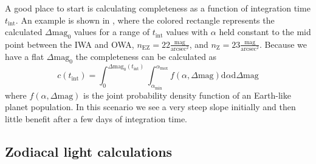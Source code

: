 A good place to start is calculating completeness
as a function of integration time $t_\textrm{int}$. An example
is shown in , where the colored rectangle
represents the calculated $\Delta\textrm{mag}_0$ values for a range of
$t_\textrm{int}$ values with $\alpha$ held constant to the mid point between
the IWA and OWA, $n_\textrm{EZ}=22 \frac{\textrm{mag}}{\textrm{arcsec}^2}$, and
$n_\textrm{Z}=23 \frac{\textrm{mag}}{\textrm{arcsec}^2}$. Because we have a
flat $\Delta\textrm{mag}_0$ the completeness can be calculated as
\begin{equation}
  c(t_\textrm{int}) = \int_{0}^{\Delta\textrm{mag}_0(t_\textrm{int})} 
  \int_{\alpha_\textrm{min}}^{\alpha_\textrm{max}} 
  f(\alpha, \Delta\textrm{mag})\textrm{d}\alpha \textrm{d}\Delta\textrm{mag}
  \label{eq:flat_comp_integral}
\end{equation}
where $f(\alpha, \Delta\textrm{mag})$ is the joint probability density function 
of an Earth-like planet population. In this scenario we see a very steep slope
initially and then little benefit after a few days of integration time.




\subsection{Zodiacal light calculations}
\label{sub:zodi}

